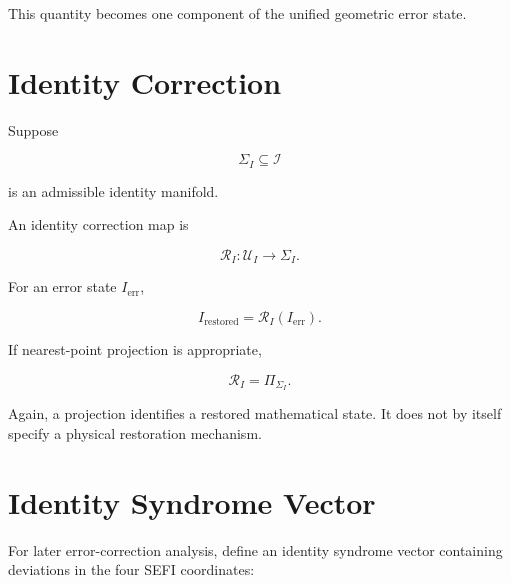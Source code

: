 \documentclass[12pt,oneside]{book}
\newcommand{\Corr}{\mathcal{R}}
\begin{document}
This quantity becomes one component of the unified geometric
error state.


\section{Identity Correction}
\label{sec:identity-correction}

Suppose

\begin{equation}
    \Sigma_I
    \subseteq
    \mathcal{I}
\end{equation}

is an admissible identity manifold.

An identity correction map is

\begin{equation}
    \Corr_I:
    \mathcal{U}_I
    \rightarrow
    \Sigma_I.
    \label{eq:identity-correction-map}
\end{equation}

For an error state \(I_{\mathrm{err}}\),

\begin{equation}
    I_{\mathrm{restored}}
    =
    \Corr_I
    \left(
        I_{\mathrm{err}}
    \right).
    \label{eq:identity-restoration}
\end{equation}

If nearest-point projection is appropriate,

\begin{equation}
    \Corr_I
    =
    \Pi_{\Sigma_I}.
    \label{eq:identity-correction-projection}
\end{equation}

Again, a projection identifies a restored mathematical state. It
does not by itself specify a physical restoration mechanism.


\section{Identity Syndrome Vector}
\label{sec:identity-syndrome}

For later error-correction analysis, define an identity syndrome
vector containing deviations in the four SEFI coordinates:
\end{document}
